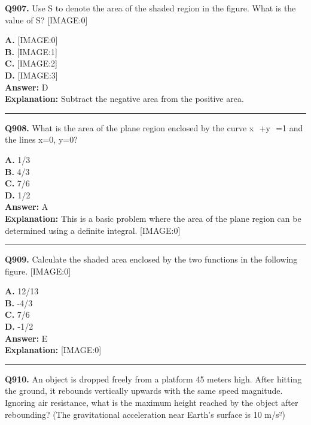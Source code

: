 \documentclass[12pt]{article}
\begin{document}
\noindent
\textbf{Q907.} Use S to denote the area of the shaded region in the figure. What is the value of S?
[IMAGE:0]



\textbf{A.} [IMAGE:0] \\
\textbf{B.} [IMAGE:1] \\
\textbf{C.} [IMAGE:2] \\
\textbf{D.} [IMAGE:3] \\

\textbf{Answer:} D \\
\textbf{Explanation:} Subtract the negative area from the positive area.

\hrule
\vspace{1em}


\noindent
\textbf{Q908.} What is the area of the plane region enclosed by the curve x
​
+y
​
=1 and the lines x=0, y=0?



\textbf{A.} 1/3 \\
\textbf{B.} 4/3 \\
\textbf{C.} 7/6 \\
\textbf{D.} 1/2 \\

\textbf{Answer:} A \\
\textbf{Explanation:} This is a basic problem where the area of the plane region can be determined using a definite integral.
[IMAGE:0]

\hrule
\vspace{1em}


\noindent
\textbf{Q909.} Calculate the shaded area enclosed by the two functions in the following figure.
[IMAGE:0]



\textbf{A.} 12/13 \\
\textbf{B.} -4/3 \\
\textbf{C.} 7/6 \\
\textbf{D.} -1/2 \\

\textbf{Answer:} E \\
\textbf{Explanation:} [IMAGE:0]

\hrule
\vspace{1em}


\noindent
\textbf{Q910.} An object is dropped freely from a platform 45 meters high. After hitting the ground, it rebounds vertically upwards with the same speed magnitude. Ignoring air resistance, what is the maximum height reached by the object after rebounding?
(The gravitational acceleration near Earth's surface is 10 m/s²)
\end{document}
